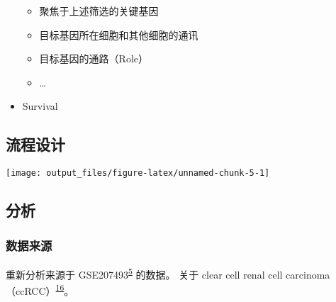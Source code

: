 \documentclass[
]{article}
\providecommand{\tightlist}{%
  \setlength{\itemsep}{0pt}\setlength{\parskip}{0pt}}
\begin{document}
\begin{itemize}
  \begin{itemize}
  \tightlist
  \item
    聚焦于上述筛选的关键基因
  \item
    目标基因所在细胞和其他细胞的通讯
  \item
    目标基因的通路（Role）
  \item
    \ldots{}
  \end{itemize}
\item
  Survival
\end{itemize}

\hypertarget{ux6d41ux7a0bux8bbeux8ba1}{%
\subsection{流程设计}\label{ux6d41ux7a0bux8bbeux8ba1}}

\texttt{[image: output\_files/figure-latex/unnamed-chunk-5-1]}

\hypertarget{ux5206ux6790}{%
\subsection{分析}\label{ux5206ux6790}}

\hypertarget{ux6570ux636eux6765ux6e90}{%
\subsubsection{数据来源}\label{ux6570ux636eux6765ux6e90}}

重新分析来源于 GSE207493\textsuperscript{\protect\hyperlink{ref-IntegrativeSinYuZh2023}{5}} 的数据。
关于 clear cell renal cell carcinoma（ccRCC）\textsuperscript{\protect\hyperlink{ref-ClearCellRenaJonasc2020}{16}}。
\end{document}
